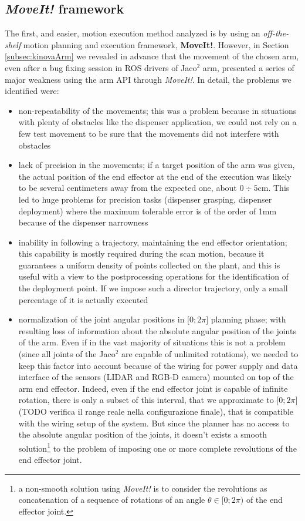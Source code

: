 \subsection{\textit{MoveIt!} framework}
The first, and easier, motion execution method analyzed is by using an \textit{off-the-shelf} motion planning and execution framework, \textbf{MoveIt!}. However, in Section \ref{subsec:kinovaArm} we revealed in advance that the movement of the chosen arm, even after a bug fixing session in \ac{ROS} drivers of Jaco$^2$ arm, presented a series of major weakness using the arm \ac{API} through \textit{MoveIt!}. In detail, the problems we identified were:
\begin{itemize}
	\item non-repeatability of the movements; this was a problem because in situations with plenty of obstacles like the dispenser application, we could not rely on a few test movement to be sure that the movements did not interfere with obstacles
	\item lack of precision in the movements; if a target position of the arm was given, the actual position of the end effector at the end of the execution was likely to be several centimeters away from the expected one, about $0\div5$cm. This led to huge problems for precision tasks (dispenser grasping, dispenser deployment) where the maximum tolerable error is of the order of 1mm because of the dispenser narrowness
	\item inability in following a trajectory, maintaining the end effector orientation; this capability is mostly required during the scan motion, because it guarantees a uniform density of points collected on the plant, and this is useful with a view to the postprocessing operations for the identification of the deployment point. If we impose such a director trajectory, only a small percentage of it is actually executed
	\item normalization of the joint angular positions in $\lbrack 0;2\pi\rbrack$ planning phase; with resulting loss of information about the absolute angular position of the joints of the arm. Even if in the vast majority of situations this is not a problem (since all joints of the Jaco$^2$ are capable of unlimited rotations), we needed to keep this factor into account because of the wiring for power supply and data interface of the sensors (\ac{LIDAR} and RGB-D camera) mounted on top of the arm end effector. Indeed, even if the end effector joint is capable of infinite rotation, there is only a subset of this interval, that we approximate to $\lbrack0;2\pi\rbrack$ (TODO verifica il range reale nella configurazione finale), that is compatible with the wiring setup of the system. But since the planner has no access to the absolute angular position of the joints, it doesn't exists a smooth solution\footnote{a non-smooth solution using \textit{MoveIt!} is to consider the revolutions as concatenation of a sequence of rotations of an angle $\theta\in\lbrack0;2\pi)$ of the end effector joint.}
to the problem of imposing one or more complete revolutions of the end effector joint.
\end{itemize}

